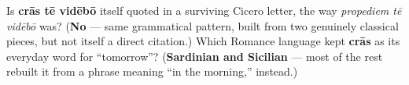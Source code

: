 \begin{tcolorbox}[breakable,colback=teal!4,colframe=teal!35!black,title={Before you move on}]
Is \textbf{crās tē vidēbō} itself quoted in a surviving Cicero letter, the way \emph{propediem tē vidēbō} was? (\textbf{No} — same grammatical pattern, built from two genuinely classical pieces, but not itself a direct citation.) Which Romance language kept \textbf{crās} as its everyday word for \textquotedblleft{}tomorrow\textquotedblright{}? (\textbf{Sardinian and Sicilian} — most of the rest rebuilt it from a phrase meaning \textquotedblleft{}in the morning,\textquotedblright{} instead.)
\end{tcolorbox}
